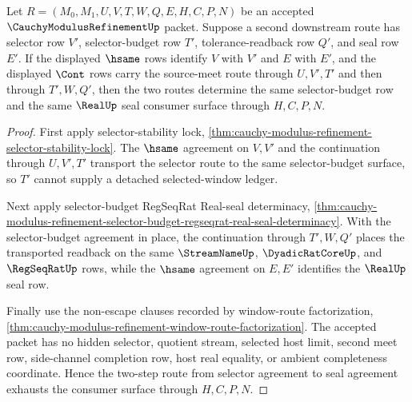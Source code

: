 \begin{theorem}
\label{thm:cauchy-modulus-refinement-selector-seal-two-step-transport}
Let $R=(M_0,M_1,U,V,T,W,Q,E,H,C,P,N)$ be an accepted $\CauchyModulusRefinementUp$ packet. Suppose a second downstream route has selector row $V'$, selector-budget row $T'$, tolerance-readback row $Q'$, and seal row $E'$. If the displayed $\hsame$ rows identify $V$ with $V'$ and $E$ with $E'$, and the displayed $\Cont$ rows carry the source-meet route through $U,V',T'$ and then through $T',W,Q'$, then the two routes determine the same selector-budget row and the same $\RealUp$ seal consumer surface through $H,C,P,N$.
\end{theorem}
\begin{proof}
First apply selector-stability lock, \autoref{thm:cauchy-modulus-refinement-selector-stability-lock}. The $\hsame$ agreement on $V,V'$ and the continuation through $U,V',T'$ transport the selector route to the same selector-budget surface, so $T'$ cannot supply a detached selected-window ledger.

Next apply selector-budget RegSeqRat Real-seal determinacy, \autoref{thm:cauchy-modulus-refinement-selector-budget-regseqrat-real-seal-determinacy}. With the selector-budget agreement in place, the continuation through $T',W,Q'$ places the transported readback on the same $\StreamNameUp$, $\DyadicRatCoreUp$, and $\RegSeqRatUp$ rows, while the $\hsame$ agreement on $E,E'$ identifies the $\RealUp$ seal row.

Finally use the non-escape clauses recorded by window-route factorization, \autoref{thm:cauchy-modulus-refinement-window-route-factorization}. The accepted packet has no hidden selector, quotient stream, selected host limit, second meet row, side-channel completion row, host real equality, or ambient completeness coordinate. Hence the two-step route from selector agreement to seal agreement exhausts the consumer surface through $H,C,P,N$.
\end{proof}

